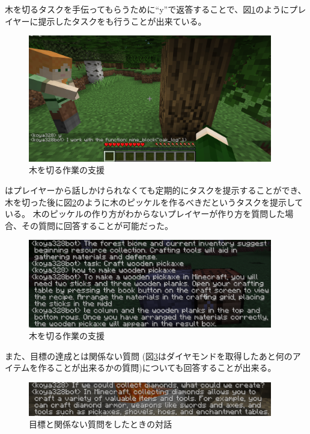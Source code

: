 木を切るタスクを手伝ってもらうために``y''で返答することで、図\ref{fig:task_help}のようにプレイヤーに提示したタスクを{\mason}も行うことが出来ている。
\begin{figure}[H]
    \centering
    \includegraphics[width=0.95\textwidth]{fig/task_help.PNG}
    \caption{木を切る作業の支援}
    \label{fig:task_help}
\end{figure}

{\mason}はプレイヤーから話しかけられなくても定期的にタスクを提示することができ、木を切った後に図\ref{fig:wooden_pickaxe}のように木のピッケルを作るべきだというタスクを提示している。
木のピッケルの作り方がわからないプレイヤーが作り方を質問した場合、その質問に回答することが可能だった。
\begin{figure}[H]
    \centering
    \includegraphics[width=0.95\textwidth]{fig/wooden_pickaxe.png}
    \caption{木を切る作業の支援}
    \label{fig:wooden_pickaxe}
\end{figure}

また、目標の達成とは関係ない質問 (図\ref{fig:diamond_question}はダイヤモンドを取得したあと何のアイテムを作ることが出来るかの質問)についても回答することが出来る。
\begin{figure}[H]
    \centering
    \includegraphics[width=0.95\textwidth]{fig/diamond_question.PNG}
    \caption{目標と関係ない質問をしたときの対話}
    \label{fig:diamond_question}
\end{figure}


